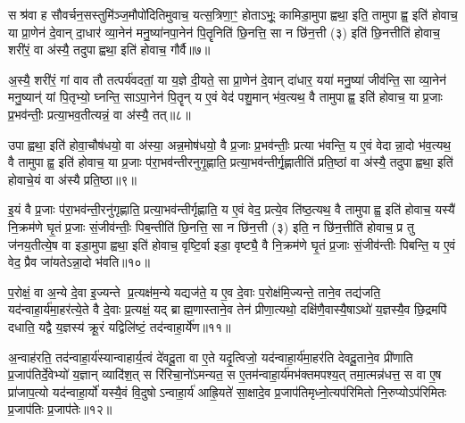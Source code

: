 {\anuvakamend[{वि॒द्वान्ध्या॑ये॒ द्यं प्रा॒श्ञन्ति॒ यां वै म॒ एका॒न्नविꣳ॑श॒तिश्च॑॥१॥}]}

सश्र॑वा ह सौवर्चन॒सस्तुमि॑ञ्ज॒मौपो॑दितिमुवाच॒ यत्स॒त्रिणा॒ꣳ॒ होताऽभूः॒ कामिडा॒मुपाह्वथा॒ इति॒ तामुपाह्व॒ इति॑ होवाच॒ या प्रा॒णेन॑ दे॒वान् दा॒धार॑ व्या॒नेन॑ मनु॒ष्या॑नपा॒नेन॑ पि॒तॄनिति॑ छि॒नत्ति॒ सा न छि॑न॒त्ती (३) इति॑ छि॒नत्तीति॑ होवाच॒ शरी॑रं॒ वा अ॑स्यै॒ तदुपाह्वथा॒ इति॑ होवाच॒ गौर्वै॥७॥

अ॒स्यै॒ शरी॑रं॒ गां वाव तौ तत्पर्य॑वदतां॒ या य॒ज्ञे दी॒यते॒ सा प्रा॒णेन॑ दे॒वान् दा॑धार॒ यया॑ मनु॒ष्या॑ जीव॑न्ति॒ सा व्या॒नेन॑ मनु॒ष्यान्॑ यां पि॒तृभ्यो॒ घ्नन्ति॒ साऽपा॒नेन॑ पि॒तॄन् य ए॒वं वेद॑ पशु॒मान् भ॑व॒त्यथ॒ वै तामुपाह्व॒ इति॑ होवाच॒ या प्र॒जाः प्र॒भव॑न्तीः॒ प्रत्या॒भव॒तीत्यन्नं॒ वा अ॑स्यै॒ तत्॥८॥

उपाह्वथा॒ इति॑ होवा॒चौष॑धयो॒ वा अ॑स्या॒ अन्न॒मोष॑धयो॒ वै प्र॒जाः प्र॒भव॑न्तीः॒ प्रत्या भ॑वन्ति॒ य ए॒वं वेदान्ना॒दो भ॑व॒त्यथ॒ वै तामुपाह्व॒ इति॑ होवाच॒ या प्र॒जाः प॑रा॒भव॑न्तीरनुगृ॒ह्णाति॒ प्रत्या॒भव॑न्तीर्गृ॒ह्णातीति॑ प्रति॒ष्ठां वा अ॑स्यै॒ तदुपाह्वथा॒ इति॑ होवाचे॒यं वा अ॑स्यै प्रति॒ष्ठा॥९॥

इ॒यं वै प्र॒जाः प॑रा॒भव॑न्ती॒रनु॑गृह्णाति॒ प्रत्या॒भव॑न्तीर्गृह्णाति॒ य ए॒वं वेद॒ प्रत्ये॒व ति॑ष्ठ॒त्यथ॒ वै तामुपाह्व॒ इति॑ होवाच॒ यस्यै॑ नि॒क्रम॑णे घृ॒तं प्र॒जाः सं॒जीव॑न्तीः॒ पिब॒न्तीति॑ छि॒नत्ति॒ सा न छि॑न॒त्ती (३) इति॒ न छि॑न॒त्तीति॑ होवाच॒ प्र तु ज॑नय॒तीत्ये॒ष वा इडा॒मुपाह्वथा॒ इति॑ होवाच॒ वृष्टि॒र्वा इडा॒ वृष्ट्यै॒ वै नि॒क्रम॑णे घृ॒तं प्र॒जाः सं॒जीव॑न्तीः पिबन्ति॒ य ए॒वं वेद॒ प्रैव जा॑यतेऽन्ना॒दो भ॑वति॥१०॥

{\anuvakamend[{गौर्वा अ॑स्यै॒ तत् प्र॑ति॒ष्ठाऽह्व॑था॒ इति॑ विश॒तिश्च॑॥२॥}]}

प॒रोक्षं॒ वा अ॒न्ये दे॒वा इ॒ज्यन्ते प्र॒त्यक्ष॑म॒न्ये यद्यज॑ते॒ य ए॒व दे॒वाः प॒रोक्ष॑मि॒ज्यन्ते॒ ताने॒व तद्य॑जति॒ यद॑न्वाहा॒र्य॑मा॒हर॑त्ये॒ते वै दे॒वाः प्र॒त्यक्षं॒ यद् ब्राह्म॒णास्ताने॒व तेन॑ प्रीणा॒त्यथो॒ दक्षि॑णै॒वास्यै॒षाऽथो॑ य॒ज्ञस्यै॒व छि॒द्रमपि॑ दधाति॒ यद्वै य॒ज्ञस्य॑ क्रू॒रं यद्विलि॑ष्टं॒ तद॑न्वाहा॒र्ये॑ण॥११॥

अ॒न्वाह॑रति॒ तद॑न्वाहा॒र्य॑स्यान्वाहार्य॒त्वं दे॑वदू॒ता वा ए॒ते यदृ॒त्विजो॒ यद॑न्वाहा॒र्य॑मा॒हर॑ति देवदू॒ताने॒व प्री॑णाति प्र॒जाप॑तिर्दे॒वेभ्यो॑ य॒ज्ञान् व्यादि॑श॒त् स रि॑रिचा॒नो॑ऽमन्यत॒ स ए॒तम॑न्वाहा॒र्य॑मभ॑क्तमपश्य॒त् तमा॒त्मन्न॑धत्त॒ स वा ए॒ष प्रा॑जाप॒त्यो यद॑न्वाहा॒र्यो॑ यस्यै॒वं वि॒दुषोऽन्वाहा॒र्य॑ आह्रि॒यते॑ सा॒क्षादे॒व प्र॒जाप॑तिमृध्नो॒त्यप॑रिमितो नि॒रुप्योऽप॑रिमितः प्र॒जाप॑तिः प्र॒जाप॑तेः॥१२॥

